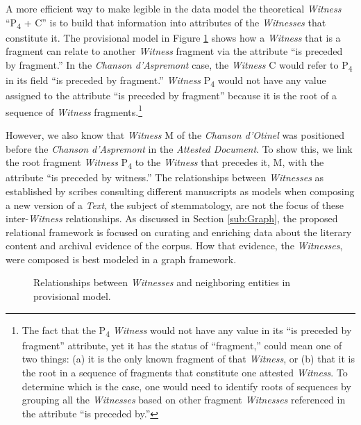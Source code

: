 A more efficient way to make legible in the data model the theoretical \textit{Witness} ``P\textsubscript{4} + C'' is to build that information into attributes of the \textit{Witnesses} that constitute it. The provisional model in Figure \ref{fig:WitnessRelations} shows how a \textit{Witness} that is a fragment can relate to another \textit{Witness} fragment via the attribute ``is preceded by fragment.'' In the \textit{Chanson d'Aspremont} case, the \textit{Witness} C would refer to P\textsubscript{4} in its field ``is preceded by fragment.'' \textit{Witness} P\textsubscript{4} would not have any value assigned to the attribute ``is preceded by fragment'' because it is the root of a sequence of \textit{Witness} fragments.\footnote{The fact that the P\textsubscript{4} \textit{Witness} would not have any value in its ``is preceded by fragment'' attribute, yet it has the status of ``fragment,'' could mean one of two things: (a) it is the only known fragment of that \textit{Witness}, or (b) that it is the root in a sequence of fragments that constitute one attested \textit{Witness}. To determine which is the case, one would need to identify roots of sequences by grouping all the \textit{Witnesses} based on other fragment \textit{Witnesses} referenced in the attribute ``is preceded by.''} 

However, we also know that \textit{Witness} M of the \textit{Chanson d'Otinel} was positioned before the \textit{Chanson d'Aspremont} in the \textit{Attested Document}. To show this, we link the root fragment \textit{Witness} P\textsubscript{4} to the \textit{Witness} that precedes it, M, with the attribute ``is preceded by witness.'' The relationships between \textit{Witnesses} as established by scribes consulting different manuscripts as models when composing a new version of a \textit{Text}, the subject of stemmatology, are not the focus of these inter-\textit{Witness} relationships. As discussed in Section \ref{sub:Graph}, the proposed relational framework is focused on curating and enriching data about the literary content and archival evidence of the corpus. How that evidence, the \textit{Witnesses}, were composed is best modeled in a graph framework.

\begin{figure}[ht]
    \begin{center}
        
    \end{center}
    \caption{Relationships between \textit{Witnesses} and neighboring entities in provisional model.}
    \label{fig:WitnessRelations}
\end{figure}



